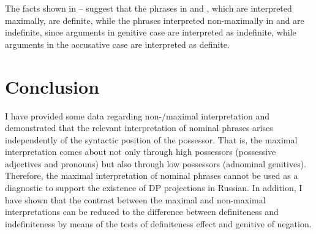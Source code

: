 \documentclass[output=paper,
colorlinks,
citecolor=brown,
newtxmath
]{langscibook}
\begin{document}
\noindent The facts shown in -- suggest that the phrases in  and , which are interpreted maximally, are definite, while the phrases interpreted non-maximally in  and  are indefinite, since arguments in genitive case are interpreted as indefinite, while arguments in the accusative case are interpreted as definite.





\section{Conclusion}\label{CON}

I have provided some data regarding non-/maximal interpretation and demonstrated that the relevant interpretation of nominal phrases arises independently of the syntactic position of the possessor. That is, the maximal interpretation comes about not only through high possessors (possessive adjectives and pronouns) but also through low possessors (adnominal genitives). Therefore, the maximal interpretation of nominal phrases cannot be used as a diagnostic to support the existence of DP projections in Russian. In addition, I have shown that the contrast between the maximal and non-maximal interpretations can be reduced to the difference between definiteness and indefiniteness by means of the tests of definiteness effect and genitive of negation.
\end{document}
